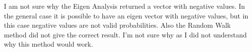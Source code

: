 \documentclass[11pt]{article}
\begin{document}
I am not sure why the Eigen Analysis returned a vector with negative values. In the general case it is possible to have an eigen vector with negative values, but in this case negative values are not valid probabilities. Also the Random Walk method did not give the correct result. I'm not sure why as I did not understand why this method would work.
\end{document}
